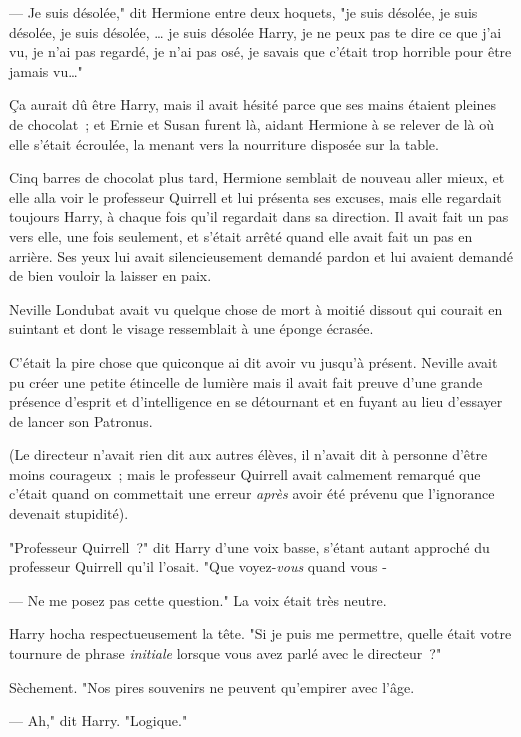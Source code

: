 --- Je suis désolée," dit Hermione entre deux hoquets, "je suis désolée, je suis désolée, je suis désolée, … je suis désolée Harry, je ne peux pas te dire ce que j'ai vu, je n'ai pas regardé, je n'ai pas osé, je savais que c'était trop horrible pour être jamais vu…"

Ça aurait dû être Harry, mais il avait hésité parce que ses mains étaient pleines de chocolat~; et Ernie et Susan furent là, aidant Hermione à se relever de là où elle s'était écroulée, la menant vers la nourriture disposée sur la table.

Cinq barres de chocolat plus tard, Hermione semblait de nouveau aller mieux, et elle alla voir le professeur Quirrell et lui présenta ses excuses, mais elle regardait toujours Harry, à chaque fois qu'il regardait dans sa direction. Il avait fait un pas vers elle, une fois seulement, et s'était arrêté quand elle avait fait un pas en arrière. Ses yeux lui avait silencieusement demandé pardon et lui avaient demandé de bien vouloir la laisser en paix.

\later

Neville Londubat avait vu quelque chose de mort à moitié dissout qui courait en suintant et dont le visage ressemblait à une éponge écrasée.

C'était la pire chose que quiconque ai dit avoir vu jusqu'à présent. Neville avait pu créer une petite étincelle de lumière mais il avait fait preuve d'une grande présence d'esprit et d'intelligence en se détournant et en fuyant au lieu d'essayer de lancer son Patronus.

(Le directeur n'avait rien dit aux autres élèves, il n'avait dit à personne d'être moins courageux~; mais le professeur Quirrell avait calmement remarqué que c'était quand on commettait une erreur \emph{après} avoir été prévenu que l'ignorance devenait stupidité).

"Professeur Quirrell~?" dit Harry d'une voix basse, s'étant autant approché du professeur Quirrell qu'il l'osait. "Que voyez-\emph{vous} quand vous -

--- Ne me posez pas cette question." La voix était très neutre.

Harry hocha respectueusement la tête. "Si je puis me permettre, quelle était votre tournure de phrase \emph{initiale} lorsque vous avez parlé avec le directeur~?"

Sèchement. "Nos pires souvenirs ne peuvent qu'empirer avec l'âge.

--- Ah," dit Harry. "Logique."

